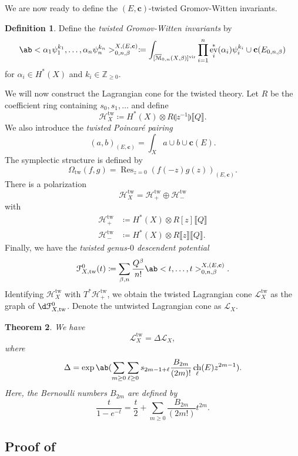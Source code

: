 \documentclass[leqno, openany]{memoir}
\newtheorem{thm}{Theorem}[section]
\theoremstyle{definition}
\newtheorem{defn}[thm]{Definition}
\theoremstyle{remark}
\theoremstyle{plain}
\theoremstyle{definition}
\theoremstyle{remark}
\newcommand{\Z}{\mathbb{Z}}
\newcommand{\mc}[1]{\mathcal{#1}}
\newcommand{\mr}[1]{\mathrm{#1}}
\newcommand{\mbf}[1]{\mathbf{#1}}
\newcommand{\on}[1]{\operatorname{#1}}
\newcommand{\Mbar}{\overline{\mathcal{M}}}
\DeclareMathOperator{\ch}{ch}
\DeclareMathOperator{\ev}{ev}
\begin{document}
We are now ready to define the $(E,\mbf{c})$-twisted Gromov-Witten invariants.

\begin{defn}
    Define the \textit{twisted Gromov-Witten invariants} by
    \[ \ab<\alpha_1 \psi_1^{k_1}, \ldots, \alpha_n \psi_n^{k_n}>_{0,n,\beta}^{X,(E, \mbf{c})} \coloneqq \int_{[\Mbar_{0,n}(X,\beta)]^{\mr{vir}}} \prod_{i=1}^n \ev_i^*(\alpha_i)\psi_i^{k_i} \cup \mbf{c}(E_{0,n,\beta}) \]
    for $\alpha_i \in H^*(X)$ and $k_i \in \Z_{\geq 0}$.
\end{defn}

We will now construct the Lagrangian cone for the twisted theory. Let $R$ be the coefficient ring containing $s_0, s_1, \ldots$ and define
\[ \mc{H}^{\mr{tw}}_X \coloneqq H^*(X)\otimes R\llparenthesis z^{-1}\rrparenthesis \llbracket Q \rrbracket. \]
We also introduce the \textit{twisted Poincar\'e pairing}
\[ (a,b)_{(E, \mbf{c})} = \int_X a \cup b \cup \mbf{c}(E). \]
The symplectic structure is defined by
\[ \Omega_{\mr{tw}}(f,g) = \on{Res}_{z=0} (f(-z) g(z))_{(E,\mbf{c})}. \]
There is a polarization
\[ \mc{H}^{\mr{tw}}_X = \mc{H}_+^{\mr{tw}} \oplus \mc{H}_-^{\mr{tw}} \]
with
\begin{align*}
    \mc{H}_+^{\mr{tw}} &\coloneqq H^*(X) \otimes R[z]\llbracket Q \rrbracket \\
    \mc{H}_-^{\mr{tw}} &\coloneqq H^*(X) \otimes R\llbracket z\rrbracket\llbracket Q \rrbracket.
\end{align*}
Finally, we have the \textit{twisted genus-$0$ descendent potential}
\[ \mc{F}_{X,\mr{tw}}^0(t) \coloneqq \sum_{\beta, n} \frac{Q^{\beta}}{n!} \ab<t,\ldots,t>_{0,n,\beta}^{X,(E,\mbf{c})}. \]
Identifying $\mc{H}^{\mr{tw}}_X$ with $T^* \mc{H}_+^{\mr{tw}}$, we obtain the twisted Lagrangian cone $\mc{L}_X^{\mr{tw}}$ as the graph of $\d \mc{F}^0_{X,\mr{tw}}$. Denote the untwisted Lagrangian cone as $\mc{L}_X$.

\begin{thm}\label{thm:qrr}
    We have
    \[ \mc{L}_X^{\mr{tw}} = \Delta \mc{L}_X, \]
    where
    \[ \Delta = \exp\ab(\sum_{m \geq 0} \sum_{\ell \geq 0} s_{2m-1+\ell} \frac{B_{2m}}{(2m)!} \ch_{\ell}(E) z^{2m-1}). \]
    Here, the Bernoulli numbers $B_{2m}$ are defined by
    \[ \frac{t}{1-e^{-t}} = \frac{t}{2} + \sum_{m \geq 0} \frac{B_{2m}}{(2m!)} t^{2m}. \]
\end{thm}

\subsection{Proof of~}
\end{document}
